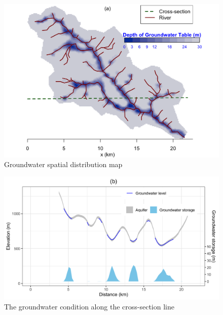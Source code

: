\documentclass[
]{scrbook}
\begin{document}
\begin{figure}
\centering
\includegraphics{Fig/Example/CacheCreek/sac5_rgw.png}
\caption{Groundwater spatial distribution map}
\end{figure}

\begin{figure}
\centering
\includegraphics{Fig/Example/CacheCreek/sac5_sgw.png}
\caption{The groundwater condition along the cross-section line}
\end{figure}
\end{document}
